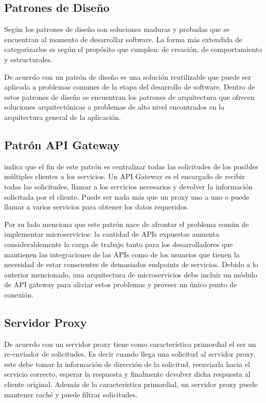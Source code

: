 \subsection{Patrones de Diseño}

Según \cite{cosmin2016patrones} los patrones de diseño son soluciones maduras y probadas que
se encuentran al momento de desarrollar software.
La forma más extendida de categorizarlos es según el propósito que cumplen: de creación, de comportamiento
y estructurales.

De acuerdo con \cite{lo2022architectural} un patrón de diseño es una solución reutilizable que puede
ser aplicada a problemas comunes de la etapa del desarrollo de software.
Dentro de estos patrones de diseño se encuentran los patrones de arquitectura que ofrecen soluciones
arquitectónicas a problemas de alto nivel encontrados en la arquitectura general de la aplicación.

\subsection{Patrón API Gateway}

\cite{trebichavsky2021api} indica que el fin de este patrón es centralizar todas las solicitudes
de los posibles múltiples clientes a los servicios.
Un API Gateway es el encargado de recibir todas las solicitudes, llamar a los servicios necesarios
y devolver la información solicitada por el cliente.
Puede ser nada más que un proxy uno a uno o puede llamar a varios servicios para obtener los datos 
requeridos.

Por su lado \cite{tomic2022towards} menciona que este patrón nace de afrontar el problema común
de implementar microservicios: la cantidad de APIs expuestas aumenta considerablemente la carga de trabajo
tanto para los desarrolladores que mantienen las integraciones de las APIs como de los usuarios que
tienen la necesidad de estar conscientes de demasiados endpoints de servicios.
Debido a lo anterior mencionado, una arquitectura de microservicios debe incluir un módulo de 
API gateway para aliviar estos problemas y proveer un único punto de conexión.
  

\subsection{Servidor Proxy}

De acuerdo con \cite{wenceslao2022network} un servidor proxy tiene como característica primordial el ser
un re-enviador de solicitudes.
Es decir cuando llega una solicitud al servidor proxy, este debe tomar la información de dirección
de la solicitud, reenviarla hacia el servicio correcto, esperar la respuesta y finalmente devolver
dicha respuesta al cliente original.
Además de la característica primordial, un servidor proxy puede mantener caché y puede filtrar solicitudes.

